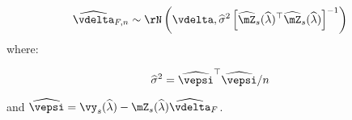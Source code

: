 \begin{subappendices}
\begin{equation}
  \widehat{\vdelta}_{F, n} \sim \rN\left(\vdelta, \widehat{\sigma}^2\left[\widehat{\mZ}_s(\widehat{\lambda})^\top\widehat{\mZ}_s(\widehat{\lambda})\right]^{-1}\right)
\end{equation}
%
where:

\begin{equation}
  \widehat{\sigma}^2 = \widehat{\vepsi}^\top\widehat{\vepsi} / n
\end{equation}

and $\widehat{\vepsi} = \vy_s(\widehat{\lambda}) - \mZ_{s}(\widehat{\lambda})\widehat{\vdelta}_{F}$.

\end{subappendices}








